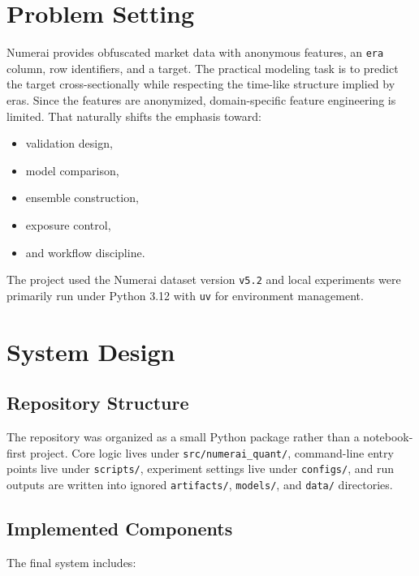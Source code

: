 \documentclass[11pt]{article}
\begin{document}
\section{Problem Setting}

Numerai provides obfuscated market data with anonymous features, an \texttt{era} column, row identifiers, and a target. The practical modeling task is to predict the target cross-sectionally while respecting the time-like structure implied by eras. Since the features are anonymized, domain-specific feature engineering is limited. That naturally shifts the emphasis toward:

\begin{itemize}[leftmargin=1.5em]
  \item validation design,
  \item model comparison,
  \item ensemble construction,
  \item exposure control,
  \item and workflow discipline.
\end{itemize}

The project used the Numerai dataset version \texttt{v5.2} and local experiments were primarily run under Python 3.12 with \texttt{uv} for environment management.

\section{System Design}

\subsection{Repository Structure}

The repository was organized as a small Python package rather than a notebook-first project. Core logic lives under \texttt{src/numerai\_quant/}, command-line entry points live under \texttt{scripts/}, experiment settings live under \texttt{configs/}, and run outputs are written into ignored \texttt{artifacts/}, \texttt{models/}, and \texttt{data/} directories.

\subsection{Implemented Components}

The final system includes:
\end{document}
